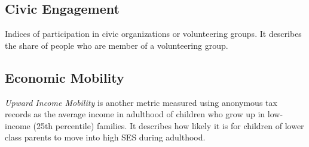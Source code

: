 \documentclass[11pt,a4paper]{article}
\begin{document}
\subsection{Civic Engagement}
Indices of participation in civic organizations or volunteering groups. It describes the share of people who are member of a volunteering group.



\subsection{Economic Mobility} 

\textit{Upward Income Mobility} is another metric measured using anonymous tax records as the average income in adulthood of children who grow up in low-income (25th percentile) families. It describes how likely it is for children of lower class parents to move into high SES during adulthood.
\end{document}
